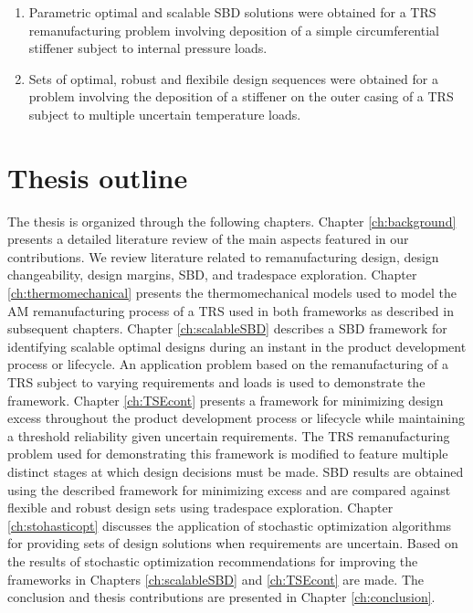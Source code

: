 \begin{enumerate}
	\item{Parametric optimal and scalable \ac{SBD} solutions were obtained for a \ac{TRS} remanufacturing problem involving deposition of a simple circumferential stiffener subject to internal pressure loads.}
	\item{Sets of optimal, robust and flexibile design sequences were obtained for a problem involving the deposition of a stiffener on the outer casing of a \ac{TRS} subject to multiple uncertain temperature loads.}
\end{enumerate}

\section{Thesis outline}
\label{sec:outline}

The thesis is organized through the following chapters. Chapter \ref{ch:background} presents a detailed literature review of the main aspects featured in our contributions. We review literature related to remanufacturing design, design changeability, design margins, \ac{SBD}, and tradespace exploration. Chapter \ref{ch:thermomechanical} presents the thermomechanical models used to model the \ac{AM} remanufacturing process of a \ac{TRS} used in both frameworks as described in subsequent chapters. Chapter \ref{ch:scalableSBD} describes a \ac{SBD} framework for identifying scalable optimal designs during an instant in the product development process or lifecycle. An application problem based on the remanufacturing of a \ac{TRS} subject to varying requirements and loads is used to demonstrate the framework. Chapter \ref{ch:TSEcont} presents a framework for minimizing design excess throughout the product development process or lifecycle while maintaining a threshold reliability given uncertain requirements. The \ac{TRS} remanufacturing problem used for demonstrating this framework is modified to feature multiple distinct stages at which design decisions must be made. \ac{SBD} results are obtained using the described framework for minimizing excess and are compared against flexible and robust design sets using tradespace exploration. Chapter \ref{ch:stohasticopt} discusses the application of stochastic optimization algorithms for providing sets of design solutions when requirements are uncertain. Based on the results of stochastic optimization recommendations for improving the frameworks in Chapters \ref{ch:scalableSBD} and \ref{ch:TSEcont} are made. The conclusion and thesis contributions are presented in Chapter \ref{ch:conclusion}.